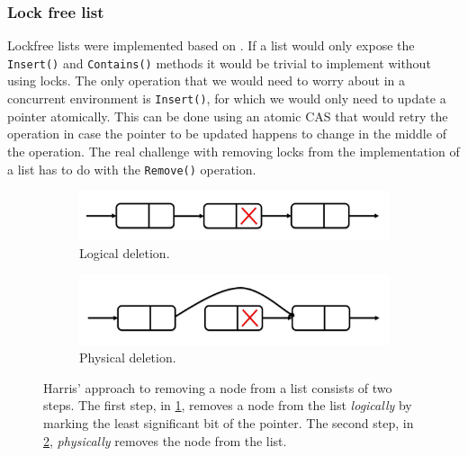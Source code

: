 \documentclass[11pt]{article}
\begin{document}
\subsubsection{Lock free list}
Lockfree lists were implemented based on \cite{Harris}. If a list would only
expose the {\tt Insert()} and {\tt Contains()} methods it would be trivial to
implement without using locks. The only operation that we would need to worry
about in a concurrent environment is {\tt Insert()}, for which we would only
need to update a pointer atomically. This can be done using an atomic CAS that
would retry the operation in case the pointer to be updated happens to change in
the middle of the operation. The real challenge with removing locks from the
implementation of a list has to do with the {\tt Remove()} operation.

\begin{figure}[h]
\begin{subfigure}{.4\textwidth}
  \centering
  \includegraphics[width=0.8\linewidth]{figs/patricio/logicallyDeleted.jpg}
  \caption{Logical deletion.}
  \label{fig:logicallyDeleted}
\end{subfigure}%
\hspace*{\fill}
\begin{subfigure}{.4\textwidth}
  \centering
  \includegraphics[width=0.8\linewidth]{figs/patricio/physicallyDeleted.jpg}
  \caption{Physical deletion.}
  \label{fig:physicallyDeleted}
\end{subfigure}
\caption{
Harris' \cite{Harris} approach to removing a node from a list consists of two
steps. The first step, in \ref{fig:logicallyDeleted}, removes a node from the list
{\em logically} by marking the least significant bit of the pointer. The second
step, in \ref{fig:physicallyDeleted}, {\em physically} removes the node from the
list.
}
\label{fig:lockFreeRemove}
\end{figure}
\end{document}
